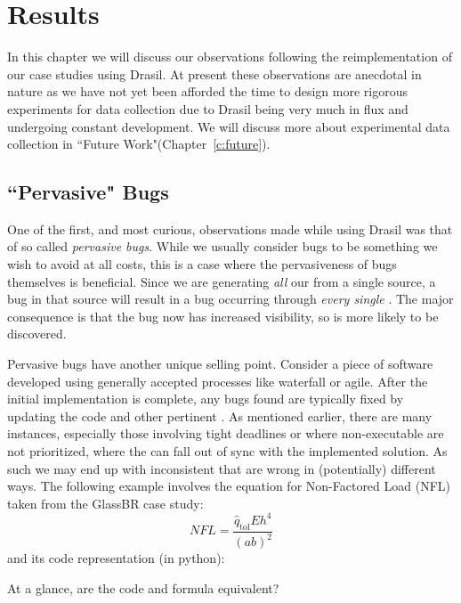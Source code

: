 \chapter{Results}
\label{c:results}

In this chapter we will discuss our observations following the reimplementation 
of our case studies using Drasil. At present these observations are 
anecdotal in nature as we have not yet been afforded the time to design more 
rigorous experiments for data collection due to Drasil being very much in flux 
and undergoing constant development. We will discuss more about experimental 
data collection in ``Future Work"(Chapter~\ref{c:future}).

\section{``Pervasive" Bugs} 

One of the first, and most curious, observations made while using Drasil
was that of so called \emph{pervasive bugs}. While we usually consider bugs to 
be something we wish to avoid at all costs, this is a case where the 
pervasiveness of bugs themselves is beneficial. Since we are generating 
\emph{all} our \sfs{} from a single source, a bug in that source will 
result in a bug occurring through \emph{every single \sf{}}. The major 
consequence is that the bug now has increased visibility, so is more likely to 
be discovered.


Pervasive bugs have another unique selling point. Consider a piece of software 
developed using generally accepted processes like 
waterfall or agile. After the initial implementation is complete, any 
bugs found are typically fixed by updating the code and other pertinent 
\sfs{}. As mentioned earlier, there are many instances, especially those 
involving tight deadlines or where non-executable \sfs{} are not 
prioritized, where the \sfs{} can fall out of sync with the implemented 
solution. As such we may end up with inconsistent \sfs{} that are wrong in 
(potentially) different ways. The following example involves the equation for 
Non-Factored Load (NFL) taken from the GlassBR case study:
\[\mathit{NFL}=\frac{{\hat{q}_{\text{tol}}} E h^{4}}{\left(a b\right)^{2}}\]
and its code representation (in python): 

At a glance, are the code and formula equivalent? 

